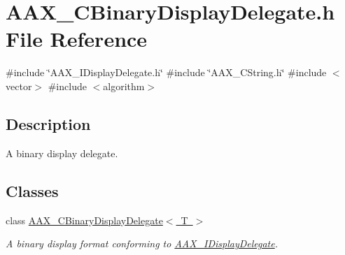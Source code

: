 \hypertarget{a00410}{}\section{A\+A\+X\+\_\+\+C\+Binary\+Display\+Delegate.\+h File Reference}
\label{a00410}
{\ttfamily \#include \char`\"{}A\+A\+X\+\_\+\+I\+Display\+Delegate.\+h\char`\"{}}\newline
{\ttfamily \#include \char`\"{}A\+A\+X\+\_\+\+C\+String.\+h\char`\"{}}\newline
{\ttfamily \#include $<$vector$>$}\newline
{\ttfamily \#include $<$algorithm$>$}\newline


\subsection{Description}
A binary display delegate. 

\subsection*{Classes}
\begin{DoxyCompactItemize}
\item 
class \mbox{\hyperlink{a01449}{A\+A\+X\+\_\+\+C\+Binary\+Display\+Delegate$<$ T $>$}}
\begin{DoxyCompactList}\small\item\em A binary display format conforming to \mbox{\hyperlink{a01801}{A\+A\+X\+\_\+\+I\+Display\+Delegate}}. \end{DoxyCompactList}\end{DoxyCompactItemize}
